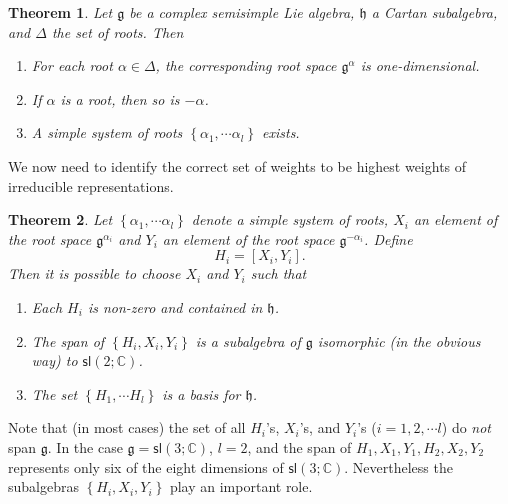 \documentclass{amsbook}
\let \frak = \mathfrak
\theoremstyle{plain}
\newtheorem{theorem}{Theorem}
\numberwithin{equation}{chapter}
\numberwithin{theorem}{chapter}
\begin{document}
\begin{theorem}
\label{roots.exist}Let $\frak{g}$ be a complex semisimple Lie algebra,
$\frak{h}$ a Cartan subalgebra, and $\Delta$ the set of roots. Then

\begin{enumerate}
\item  For each root $\alpha\in\Delta$, the corresponding root space
$\frak{g}^{\alpha}$ is one-dimensional.

\item  If $\alpha$ is a root, then so is $-\alpha$.

\item  A simple system of roots $\left\{  \alpha_{1},\cdots\alpha_{l}\right\}
$ exists.
\end{enumerate}
\end{theorem}

We now need to identify the correct set of weights to be highest weights of
irreducible representations.

\begin{theorem}
\label{sl2s}Let $\left\{  \alpha_{1},\cdots\alpha_{l}\right\}  $ denote a
simple system of roots, $X_{i}$ an element of the root space $\frak{g}%
^{\alpha_{i}}$ and $Y_{i}$ an element of the root space $\frak{g}^{-\alpha
_{i}}$. Define
\[
H_{i}=\left[  X_{i},Y_{i}\right]  \text{.}%
\]
Then it is possible to choose $X_{i}$ and $Y_{i}$ such that

\begin{enumerate}
\item  Each $H_{i}$ is non-zero and contained in $\frak{h}$.

\item  The span of $\left\{  H_{i},X_{i},Y_{i}\right\}  $ is a subalgebra of
$\frak{g}$ isomorphic (in the obvious way) to $\mathsf{sl}(2;\mathbb{C})$.

\item  The set $\left\{  H_{1},\cdots H_{l}\right\}  $ is a basis for
$\frak{h}$.
\end{enumerate}
\end{theorem}

Note that (in most cases) the set of all $H_{i}$'s, $X_{i}$'s, and $Y_{i}$'s
($i=1,2,\cdots l$) do \textit{not} span $\frak{g}$. In the case $\frak{g}%
=\mathsf{sl}\left(  3;\mathbb{C}\right)  $, $l=2$, and the span of
$H_{1},X_{1},Y_{1},H_{2},X_{2},Y_{2}$ represents only six of the eight
dimensions of $\mathsf{sl}\left(  3;\mathbb{C}\right)  $. Nevertheless the
subalgebras $\left\{  H_{i},X_{i},Y_{i}\right\}  $ play an important role.
\end{document}
